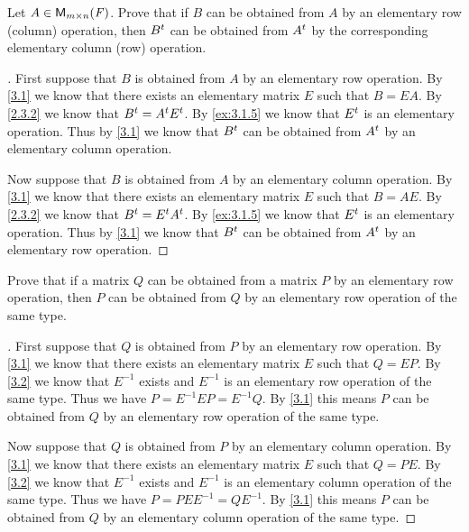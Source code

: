 \begin{ex}\label{ex:3.1.6}
	Let \(A \in \ms\).
	Prove that if \(B\) can be obtained from \(A\) by an elementary row (column) operation, then \({B}^{t}\) can be obtained from \({A}^{t}\) by the corresponding elementary column (row) operation.
\end{ex}

\begin{proof}[]
	First suppose that \(B\) is obtained from \(A\) by an elementary row operation.
	By \cref{3.1} we know that there exists an elementary matrix \(E\) such that \(B = EA\).
	By \cref{2.3.2} we know that \({B}^{t} = {A}^{t} {E}^{t}\).
	By \cref{ex:3.1.5} we know that \({E}^{t}\) is an elementary operation.
	Thus by \cref{3.1} we know that \({B}^{t}\) can be obtained from \({A}^{t}\) by an elementary column operation.

	Now suppose that \(B\) is obtained from \(A\) by an elementary column operation.
	By \cref{3.1} we know that there exists an elementary matrix \(E\) such that \(B = AE\).
	By \cref{2.3.2} we know that \({B}^{t} = {E}^{t} {A}^{t}\).
	By \cref{ex:3.1.5} we know that \({E}^{t}\) is an elementary operation.
	Thus by \cref{3.1} we know that \({B}^{t}\) can be obtained from \({A}^{t}\) by an elementary row operation.
\end{proof}

\setcounter{ex}{7}
\begin{ex}\label{ex:3.1.8}
	Prove that if a matrix \(Q\) can be obtained from a matrix \(P\) by an elementary row operation, then \(P\) can be obtained from \(Q\) by an elementary row operation of the same type.
\end{ex}

\begin{proof}[]
	First suppose that \(Q\) is obtained from \(P\) by an elementary row operation.
	By \cref{3.1} we know that there exists an elementary matrix \(E\) such that \(Q = EP\).
	By \cref{3.2} we know that \(E^{-1}\) exists and \(E^{-1}\) is an elementary row operation of the same type.
	Thus we have \(P = E^{-1} E P = E^{-1} Q\).
	By \cref{3.1} this means \(P\) can be obtained from \(Q\) by an elementary row operation of the same type.

	Now suppose that \(Q\) is obtained from \(P\) by an elementary column operation.
	By \cref{3.1} we know that there exists an elementary matrix \(E\) such that \(Q = PE\).
	By \cref{3.2} we know that \(E^{-1}\) exists and \(E^{-1}\) is an elementary column operation of the same type.
	Thus we have \(P = P E E^{-1} = Q E^{-1}\).
	By \cref{3.1} this means \(P\) can be obtained from \(Q\) by an elementary column operation of the same type.
\end{proof}

